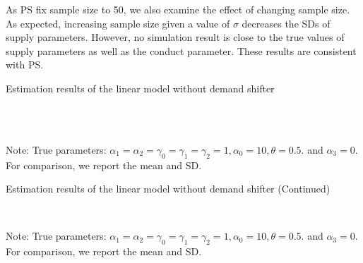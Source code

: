 \documentclass[11pt, a4paper]{article}
\begin{document}
As PS fix sample size to 50, we also examine the effect of changing sample size.
As expected, increasing sample size given a value of $\sigma$ decreases the SDs of supply parameters.
However, no simulation result is close to the true values of supply parameters as well as the conduct parameter.
These results are consistent with PS.

\begin{table}[!htbp]
  \begin{center}
      \caption{Estimation results of the linear model without demand shifter}
      \label{tb:linear_linear_sigma_1_without_demand_shifter_y} 
      \subfloat[$\sigma=0.001$]{}\\
      \subfloat[$\sigma=0.5$]{}\\
  \end{center}\footnotesize
  Note: True parameters: $\alpha_1 = \alpha_2 =  \gamma_0 = \gamma_1 = \gamma_2  =  1, \alpha_0 = 10, \theta = 0.5.$ and $\alpha_3 =0$. For comparison, we report the mean and SD.
\end{table} 

\begin{table}[!htbp]
  \ContinuedFloat
  \begin{center}
      \caption{Estimation results of the linear model without demand shifter (Continued)}
      \subfloat[$\sigma=1.0$]{}\\
    \subfloat[$\sigma=2.0$]{}
  \end{center}\footnotesize
  Note: True parameters: $\alpha_1 = \alpha_2 =  \gamma_0 = \gamma_1 = \gamma_2  =  1, \alpha_0 = 10, \theta = 0.5.$ and $\alpha_3 =0$. For comparison, we report the mean and SD.
\end{table} 
\end{document}
